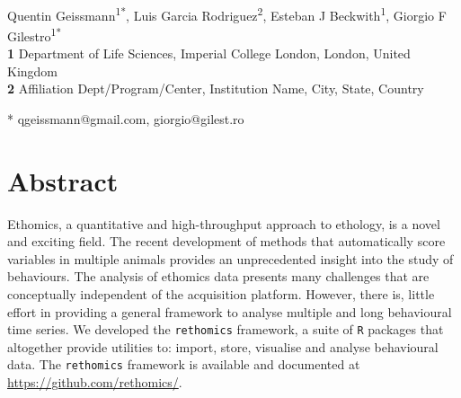 \documentclass[10pt,letterpaper]{article}
\date{}
\begin{document}
\vspace*{0.2in}

\begin{flushleft}
{\Large
\textbf{} 
}
\newline
\\
Quentin Geissmann\textsuperscript{1*},
Luis Garcia Rodriguez\textsuperscript{2},
Esteban J Beckwith\textsuperscript{1},
Giorgio F Gilestro\textsuperscript{1*}
\\
\bigskip
\textbf{1} Department of Life Sciences, Imperial College London, London, United Kingdom
\\
\textbf{2} Affiliation Dept/Program/Center, Institution Name, City, State, Country %
\\
\bigskip


* qgeissmann@gmail.com, giorgio@gilest.ro

\end{flushleft}
\section*{Abstract}
Ethomics, a quantitative and high-throughput approach to ethology, is a novel and exciting field.
The recent development of methods that automatically score variables in multiple animals provides an unprecedented insight into the study of behaviours. 
The analysis of ethomics data presents many challenges that are conceptually independent of the acquisition platform.
However, there is, little effort in providing a general framework to analyse multiple and long behavioural time series.
We developed the \texttt{rethomics} framework, a suite of \texttt{R} packages that altogether provide utilities to:
import, store, visualise and analyse behavioural data.
The \texttt{rethomics} framework is available and documented at \href{https://github.com/rethomics}{https://github.com/rethomics/}.



\end{document}
